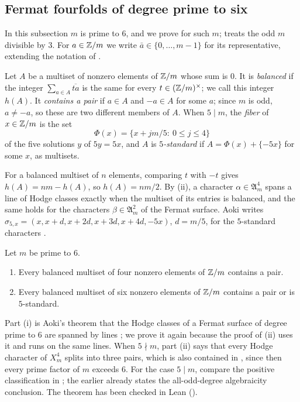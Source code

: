 \subsection{Fermat fourfolds of degree prime to six}\label{ssec:fermatfour}

In this subsection $m$ is prime to $6$, and we prove  for such
$m$;  treats the odd $m$ divisible by $3$. For
$a\in\mathbb{Z}/m$ we write $\bar a\in\{0,\dots,m-1\}$ for its representative,
extending the notation of .

\begin{definition}\label{def:balanced}
Let $A$ be a multiset of nonzero elements of $\mathbb{Z}/m$ whose sum is $0$. It is
\emph{balanced} if the integer $\sum_{a\in A}\overline{ta}$ is the same for
every $t\in(\mathbb{Z}/m)^{\times}$; we call this integer $h(A)$. It \emph{contains a
pair} if $a\in A$ and $-a\in A$ for some $a$; since $m$ is odd, $a\ne-a$, so
these are two different members of $A$. When $5\mid m$, the \emph{fiber} of
$x\in\mathbb{Z}/m$ is the set
\[
  \Phi(x)=\{x+jm/5:\ 0\le j\le4\}
\]
of the five solutions $y$ of $5y=5x$, and $A$ is \emph{$5$-standard} if
$A=\Phi(x)+\{-5x\}$ for some $x$, as multisets.
\end{definition}

For a balanced multiset of $n$ elements, comparing $t$ with $-t$ gives
$h(A)=nm-h(A)$, so $h(A)=nm/2$. By (ii), a character
$\alpha\in\mathfrak{A}^{4}_{m}$ spans a line of Hodge classes exactly when
the multiset of its entries is balanced, and the same holds for the
characters $\beta\in\mathfrak{A}^{2}_{m}$ of the Fermat surface. Aoki
writes $\sigma_{5,x}=(x,x+d,x+2d,x+3d,x+4d,-5x)$, $d=m/5$, for the
$5$-standard characters \cite{Aok87}.

\begin{theorem}\label{thm:sextuples}
Let $m$ be prime to $6$.
\begin{enumerate}[label=\textup{(\roman*)}]
\item Every balanced multiset of four nonzero elements of $\mathbb{Z}/m$ contains a
pair.
\item Every balanced multiset of six nonzero elements of $\mathbb{Z}/m$ contains a
pair or is $5$-standard.
\end{enumerate}
\end{theorem}

Part (i) is Aoki's theorem that the Hodge classes of a Fermat
surface of degree prime to $6$ are spanned by lines \cite[Theorem~A]{Aok83};
we prove it again because the proof of (ii) uses it and runs on the same
lines. When $5\nmid m$, part (ii) says that every Hodge character of
$X^{4}_{m}$ splits into three pairs, which is also contained in
\cite[Theorem~A]{Aok83}, since then every prime factor of $m$ exceeds $6$.
For the case $5\mid m$, compare the positive classification in
\cite[Theorem~7.6]{Li26b}; the earlier \cite{Li26a} already states the
all-odd-degree algebraicity conclusion. The theorem has been checked in Lean
().

